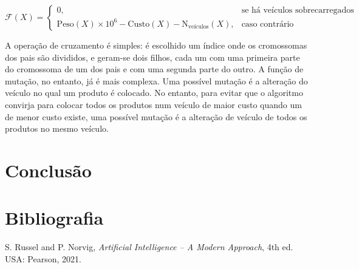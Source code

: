 \documentclass[12pt, a4paper]{article}
\begin{document}
$$
\mathcal{F}(X) =
\begin{cases}
    0
        ,& \text{se há veículos sobrecarregados} \\
    \text{Peso}(X) \times 10^6 - \text{Custo}(X) - \text{N}_\text{veículos}(X)
        ,& \text{caso contrário}
\end{cases}
$$

A operação de cruzamento é simples: é escolhido um índice onde os cromossomas dos pais são
divididos, e geram-se dois filhos, cada um com uma primeira parte do cromossoma de um dos pais e com
uma segunda parte do outro. A função de mutação, no entanto, já é mais complexa. Uma possível
mutação é a alteração do veículo no qual um produto é colocado. No entanto, para evitar que o
algoritmo convirja para colocar todos os produtos num veículo de maior custo quando um de menor
custo existe, uma possível mutação é a alteração de veículo de todos os produtos no mesmo veículo.

\section{Conclusão}

\section{Bibliografia}
\def\refname{}
\vspace{-1.5cm}
\begin{thebibliography}{9}
     S. Russel and P. Norvig, \emph{Artificial Intelligence -- A Modern Approach},
        4th ed. USA: Pearson, 2021.
\end{thebibliography}
\end{document}
